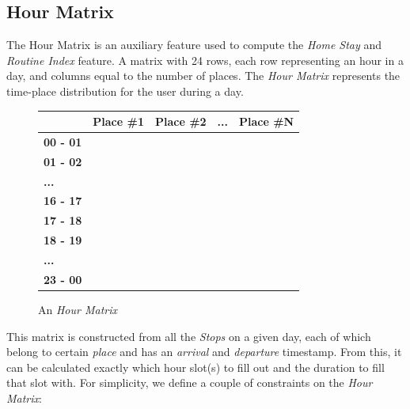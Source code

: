 \subsection{Hour Matrix}
The Hour Matrix is an auxiliary feature used to compute the \textit{Home Stay} and \textit{Routine Index} feature. A matrix with 24 rows, each row representing an hour in a day, and columns equal to the number of places. The \textit{Hour Matrix} represents the time-place distribution for the user during a day.
\begin{figure}
    \centering
    \begin{tabular}{|l|l|l|l|l|}
    \hline
    \textbf{}        & \textbf{Place \#1} & \textbf{Place \#2} & \textbf{...} & \textbf{Place \#N} \\ \hline
    \textbf{00 - 01} &                    &                    &              &                    \\ \hline
    \textbf{01 - 02} &                    &                    &              &                    \\ \hline
    \textbf{...}     &                    &                    &              &                    \\ \hline
    \textbf{16 - 17} &                    &                    &              &                    \\ \hline
    \textbf{17 - 18} &                    &                    &              &                    \\ \hline
    \textbf{18 - 19} &                    &                    &              &                    \\ \hline
    \textbf{...}     &                    &                    &              &                    \\ \hline
    \textbf{23 - 00} &                    &                    &              &                    \\ \hline
    \end{tabular}
    \caption{An \textit{Hour Matrix}}
    \label{fig:time-table}
\end{figure}

This matrix is constructed from all the \textit{Stops} on a given day, each of which belong to certain \textit{place} and has an \textit{arrival} and \textit{departure} timestamp. From this, it can be calculated exactly which hour slot(s) to fill out and the duration to fill that slot with. For simplicity, we define a couple of constraints on the \textit{Hour Matrix}:


